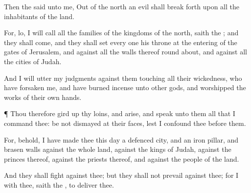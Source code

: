 {Then the
{}
said unto me, Out of the
north an
evil shall break
forth upon all the
inhabitants of the
land.

For, lo, I will
call all the
families of the
kingdoms of the
north,
saith the
{}; and they shall
come, and they shall
set every
one his
throne at the
entering of the
gates of
Jerusalem, and against all the
walls thereof round
about, and against all the
cities of
Judah.

And I will
utter my
judgments against them
touching all their
wickedness, who have
forsaken me, and have burned
incense unto
other
gods, and
worshipped the
works of their own
hands.


\par }{\PP {}¶ Thou therefore gird
up thy
loins, and
arise, and
speak unto them all that I
command thee: be not
dismayed at their
faces, lest I
confound thee
before them.

For, behold,
I have
made thee this
day a
defenced
city, and an
iron
pillar, and
brasen
walls against the whole
land, against the
kings of
Judah, against the
princes thereof, against the
priests thereof, and against the
people of the
land.

And they shall
fight against thee; but they shall not
prevail against thee; for I
{} with thee,
saith the
{}, to
deliver thee.




\par }
